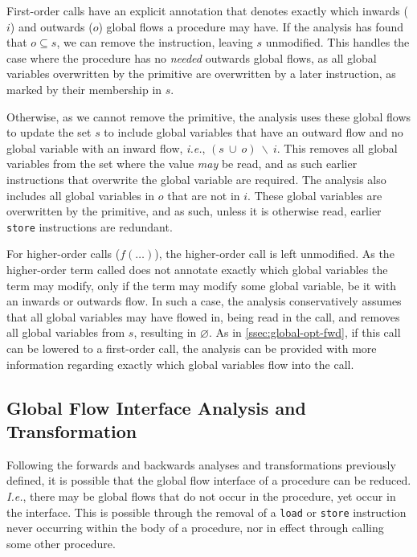 First-order calls have an explicit annotation that denotes exactly which inwards ($i$) and outwards ($o$) global flows a procedure may have. If the analysis has found that $o \subseteq s$, we can remove the instruction, leaving $s$ unmodified. This handles the case where the procedure has no \textit{needed} outwards global flows, as all global variables overwritten by the primitive are overwritten by a later instruction, as marked by their membership in $s$. 

Otherwise, as we cannot remove the primitive, the analysis uses these global flows to update the set $s$ to include global variables that have an outward flow and no global variable with an inward flow, \textit{i.e.}, $(s\ \cup\ o)\ \backslash\ i$. This removes all global variables from the set where the value \textit{may} be read, and as such earlier instructions that overwrite the global variable are required. The analysis also includes all global variables in $o$ that are not in $i$. These global variables are overwritten by the primitive, and as such, unless it is otherwise read, earlier \texttt{store} instructions are redundant. 

For higher-order calls ($f(\dots)$), the higher-order call is left unmodified. As the higher-order term called does not annotate exactly which global variables the term may modify, only if the term may modify some global variable, be it with an inwards or outwards flow. In such a case, the analysis conservatively assumes that all global variables may have flowed in, being read in the call, and removes all global variables from $s$, resulting in $\varnothing$. As in \cref{ssec:global-opt-fwd}, if this call can be lowered to a first-order call, the analysis can be provided with more information regarding exactly which global variables flow into the call.

\subsection{Global Flow Interface Analysis and Transformation}
\label{ssec:global-opt-interface}

Following the forwards and backwards analyses and transformations previously defined, it is possible that the global flow interface of a procedure can be reduced. \textit{I.e.}, there may be global flows that do not occur in the procedure, yet occur in the interface. This is possible through the removal of a \texttt{load} or \texttt{store} instruction never occurring within the body of a procedure, nor in effect through calling some other procedure. 

